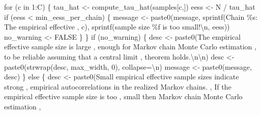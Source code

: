 \documentclass[
  letterpaper,
  DIV=11,
  numbers=noendperiod]{scrartcl}
\newenvironment{Shaded}{\begin{snugshade}}{\end{snugshade}}
\newcommand{\AttributeTok}[1]{\textcolor[rgb]{0.40,0.45,0.13}{#1}}
\newcommand{\ConstantTok}[1]{\textcolor[rgb]{0.56,0.35,0.01}{#1}}
\newcommand{\ControlFlowTok}[1]{\textcolor[rgb]{0.00,0.23,0.31}{#1}}
\newcommand{\DecValTok}[1]{\textcolor[rgb]{0.68,0.00,0.00}{#1}}
\newcommand{\FunctionTok}[1]{\textcolor[rgb]{0.28,0.35,0.67}{#1}}
\newcommand{\NormalTok}[1]{\textcolor[rgb]{0.00,0.23,0.31}{#1}}
\newcommand{\OtherTok}[1]{\textcolor[rgb]{0.00,0.23,0.31}{#1}}
\newcommand{\SpecialCharTok}[1]{\textcolor[rgb]{0.37,0.37,0.37}{#1}}
\newcommand{\StringTok}[1]{\textcolor[rgb]{0.13,0.47,0.30}{#1}}
\begin{document}
\begin{Shaded}
\begin{Highlighting}[]
  \ControlFlowTok{for}\NormalTok{ (c }\ControlFlowTok{in} \DecValTok{1}\SpecialCharTok{:}\NormalTok{C) \{}
\NormalTok{    tau\_hat }\OtherTok{\textless{}{-}} \FunctionTok{compute\_tau\_hat}\NormalTok{(samples[c,])}
\NormalTok{    eess }\OtherTok{\textless{}{-}}\NormalTok{ N }\SpecialCharTok{/}\NormalTok{ tau\_hat}
    \ControlFlowTok{if}\NormalTok{ (eess }\SpecialCharTok{\textless{}}\NormalTok{ min\_eess\_per\_chain) \{}
\NormalTok{      message }\OtherTok{\textless{}{-}} \FunctionTok{paste0}\NormalTok{(message,}
                        \FunctionTok{sprintf}\NormalTok{(}\StringTok{\textquotesingle{}Chain \%s: The empirical effective \textquotesingle{}}\NormalTok{, c),}
                        \FunctionTok{sprintf}\NormalTok{(}\StringTok{\textquotesingle{}sample size \%f is too small!}\SpecialCharTok{\textbackslash{}n}\StringTok{\textquotesingle{}}\NormalTok{, eess))}
\NormalTok{      no\_warning }\OtherTok{\textless{}{-}} \ConstantTok{FALSE}
\NormalTok{    \}}
\NormalTok{  \}}
  \ControlFlowTok{if}\NormalTok{ (no\_warning) \{}
\NormalTok{    desc }\OtherTok{\textless{}{-}} \FunctionTok{paste0}\NormalTok{(}\StringTok{\textquotesingle{}The empirical effective sample size is large \textquotesingle{}}\NormalTok{,}
                   \StringTok{\textquotesingle{}enough for Markov chain Monte Carlo estimation \textquotesingle{}}\NormalTok{,}
                   \StringTok{\textquotesingle{}to be reliable assuming that a central limit \textquotesingle{}}\NormalTok{,}
                   \StringTok{\textquotesingle{}theorem holds.}\SpecialCharTok{\textbackslash{}n\textbackslash{}n}\StringTok{\textquotesingle{}}\NormalTok{)}
\NormalTok{    desc }\OtherTok{\textless{}{-}} \FunctionTok{paste0}\NormalTok{(}\FunctionTok{strwrap}\NormalTok{(desc, max\_width, }\DecValTok{0}\NormalTok{), }\AttributeTok{collapse=}\StringTok{\textquotesingle{}}\SpecialCharTok{\textbackslash{}n}\StringTok{\textquotesingle{}}\NormalTok{)}
\NormalTok{    message }\OtherTok{\textless{}{-}} \FunctionTok{paste0}\NormalTok{(message, desc)}
\NormalTok{  \} }\ControlFlowTok{else}\NormalTok{ \{}
\NormalTok{    desc }\OtherTok{\textless{}{-}} \FunctionTok{paste0}\NormalTok{(}\StringTok{\textquotesingle{}Small empirical effective sample sizes indicate strong \textquotesingle{}}\NormalTok{,}
                   \StringTok{\textquotesingle{}empirical autocorrelations in the realized Markov chains. \textquotesingle{}}\NormalTok{,}
                   \StringTok{\textquotesingle{}If the empirical effective sample size is too \textquotesingle{}}\NormalTok{,}
                   \StringTok{\textquotesingle{}small then Markov chain Monte Carlo estimation \textquotesingle{}}\NormalTok{,}

\end{Highlighting}
\end{Shaded}
\end{document}
